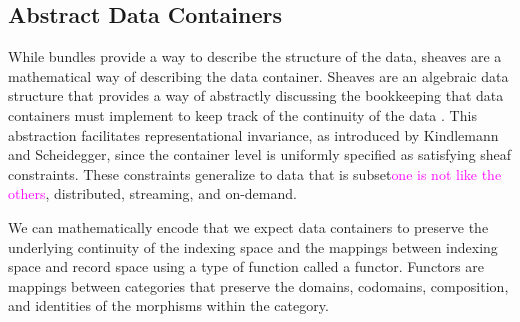 \documentclass[journal]{IEEEtran}
\newcommand{\note}[1]{\textcolor{magenta}{#1}}
\theoremstyle{definition}
\theoremstyle{remark}
\begin{document}
\subsection{Abstract Data Containers}
\label{sec:atct:sheaves}
While bundles provide a way to describe the structure of the data, sheaves are a mathematical way of describing the data container. Sheaves are an algebraic data structure that provides a way of abstractly discussing the bookkeeping that data containers must implement to keep track of the continuity of the data \cite{ghristElementaryAppliedTopology2014}. This abstraction facilitates representational invariance, as introduced by Kindlemann and Scheidegger\cite{kindlmannAlgebraicProcessVisualization2014}, since the container level is uniformly specified as satisfying sheaf constraints. These constraints generalize to data that is subset\note{one is not like the others}, distributed, streaming, and on-demand. 


We can mathematically encode that we expect data containers to preserve the underlying continuity of the indexing space and the mappings between indexing space and record space using a type of function called a functor. Functors are mappings between categories that preserve the domains, codomains, composition, and identities of the morphisms within the category\cite{riehlCategoryTheoryContext}.
\end{document}
